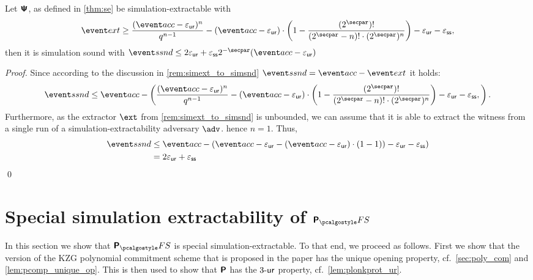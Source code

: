 \documentclass[runningheads,11pt]{llncs}
\begin{document}
\begin{corollary}
  \label{cor:simext_to_ssnd}
  Let $\bm{\mathsf{\Psi}}$, as defined in \cref{thm:se} be simulation-extractable with
	\[
    \extProb \geq \frac{(\accProb - \epsur)^{n}}{q^{n - 1}} -
	(\accProb - \epsur) \cdot \left( 1 -
      \frac{(2^\secpar) !}{(2^\secpar - n)! \cdot
        (2^\secpar)^{n}}\right)
    - \epsur - \epsss,
  \]
  then it is simulation sound with
  $\ssndProb \leq 2\epsur + \epsss 2^{-\secpar}(\accProb - \epsur)$
\end{corollary}
\begin{proof}
  Since according to the discussion in \cref{rem:simext_to_simsnd} $\ssndProb =
  \accProb - \extProb$ it holds:
  \begin{align*}
    \ssndProb \leq \accProb - \left(\frac{(\accProb - \epsur)^{n}}{q^{n - 1}} -
	(\accProb - \epsur) \cdot \left( 1 -
      \frac{(2^\secpar) !}{(2^\secpar - n)! \cdot
        (2^\secpar)^{n}}\right)
    - \epsur - \epsss,\right).
  \end{align*}
  Furthermore, as the extractor $\ext$ from \cref{rem:simext_to_simsnd} is unbounded, we can
  assume that it is able to extract the witness from a single run of a
  simulation-extractability adversary $\adv$. hence $n = 1$. Thus,
  \begin{equation*}
    \begin{split}
      \ssndProb & \leq \accProb - \left(\accProb - \epsur -
                  (\accProb - \epsur) \cdot \left( 1 -
                  1)\right)
                  - \epsur - \epsss\right) \\
                & =  2 \epsur 
                  + \epsss \\
                \end{split}
              \end{equation*}
              \qed
\end{proof}


\section{Special simulation extractability of $\plonkprotfs$} 
\label{sec:plonk}
In this section we show that $\plonkprotfs$ is special simulation-extractable. To that
end, we proceed as follows. First we show that the version of the KZG polynomial
commitment scheme that is proposed in the \plonk{} paper has the unique opening
property, cf.~\cref{sec:poly_com} and \cref{lem:pcomp_unique_op}. This is then
used to show that $\bm{\mathsf{P}}$ has the ${3\text{-}\mathsf{ur}}$ property,
cf.~\cref{lem:plonkprot_ur}.
\end{document}
